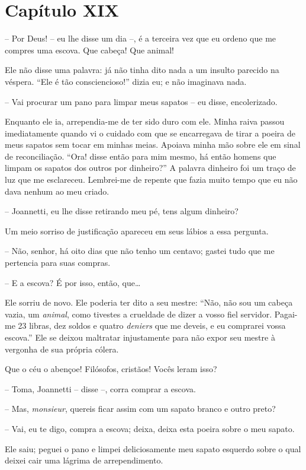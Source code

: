 \section*{Capítulo XIX}

 -- Por Deus! -- eu lhe disse um dia --, é a terceira vez que eu
ordeno que me compres uma escova. Que cabeça! Que animal!

 Ele não disse uma palavra: já não tinha dito nada a um insulto parecido
na véspera. ``Ele é tão consciencioso!'' dizia eu; e não imaginava nada.

 -- Vai procurar um pano para limpar meus sapatos -- eu disse,
encolerizado.

Enquanto ele ia, arrependia-me de ter sido duro com ele. Minha raiva
passou imediatamente quando vi o cuidado com que se encarregava de
tirar a poeira de meus sapatos sem tocar em minhas meias. Apoiava minha
mão sobre ele em sinal de reconciliação. ``Ora! disse então para mim
mesmo, há então homens que limpam os sapatos dos outros por dinheiro?''
A palavra dinheiro foi um traço de luz que me esclareceu. Lembrei-me de
repente que fazia muito tempo que eu não dava nenhum ao meu criado.

-- Joannetti, eu lhe disse retirando meu pé, tens algum dinheiro?

Um meio sorriso de justificação apareceu em seus lábios a essa pergunta.


-- Não, senhor, há oito dias que não tenho um centavo; gastei tudo que
me pertencia para suas compras.

-- E a escova? É por isso, então, que\ldots

Ele sorriu de novo. Ele poderia ter dito a seu mestre: ``Não, não sou um
cabeça vazia, um \textit{animal}, como tivestes a crueldade de dizer a
vosso fiel servidor. Pagai-me 23 libras, dez soldos e quatro \textit{deniers}
que me deveis, e eu comprarei vossa escova.'' Ele se deixou maltratar
injustamente para não expor seu mestre à vergonha de sua própria
cólera.

Que o céu o abençoe! Filósofos, cristãos! Vocês leram isso?

-- Toma, Joannetti -- disse --, corra comprar a escova.

-- Mas, \textit{monsieur}, quereis ficar assim com um sapato branco e
outro preto?

-- Vai, eu te digo, compra a escova; deixa, deixa esta poeira sobre o
meu sapato.

Ele saiu; peguei o pano e limpei deliciosamente meu sapato esquerdo
sobre o qual deixei cair uma lágrima de arrependimento.

